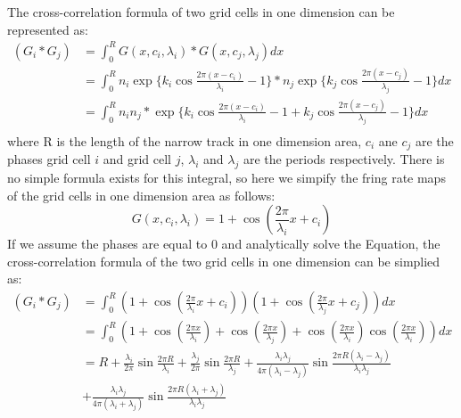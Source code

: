 \documentclass[11pt, letterpaper, onecolumn]{article}
\begin{document}
The cross-correlation formula of two grid cells in one dimension can be represented as:
\begin{equation}
\begin{split}
    (G_i * G_j)
    & = \int_{0}^{R} G(x,c_i,\lambda_i) * G(x,c_j,\lambda_j) dx \\
   & = \int_{0}^{R} n_i  \exp\{k_i \cos \frac{2 \pi (x - c_i)}{\lambda_i}-1 \} * n_j  \exp\{k_j \cos \frac{2 \pi (x - c_j)}{\lambda_j}-1 \} dx \\
   & = \int_{0}^{R} n_i n_j* \exp\{k_i \cos \frac{2 \pi (x - c_i)}{\lambda_i}-1 + k_j \cos \frac{2 \pi (x - c_j)}{\lambda_j}-1 \} dx  \\
\end{split}
\end{equation}
where R is the length of the narrow track in one dimension area, $c_i$ ane $c_j$ are the phases grid cell $i$ and grid cell $j$, $\lambda_i$ and $\lambda_j$ are the periods respectively. There is no simple formula exists for this integral, so here we simpify the fring rate maps of the grid cells in one dimension area as follows: 
\begin{equation}
    G(x, c_i,\lambda_i) = 1 + \cos(\frac{2 \pi}{\lambda_i} x + c_i)
\end{equation}
If we assume the phases are equal to 0 and analytically solve the Equation, the cross-correlation formula of the two grid cells in one dimension can be simplied as:
\begin{equation}
\label{eq:intresult}
\begin{split}
    (G_i * G_j)
    & = \int_{0}^{R} (1 + \cos(\frac{2 \pi}{\lambda_i} x + c_i)) (1 + \cos(\frac{2 \pi}{\lambda_j} x + c_j)) dx \\
    & = \int_{0}^{R} (1 + \cos(\frac{2 \pi x}{\lambda_i}) + \cos(\frac{2 \pi x}{\lambda_j}) + \cos(\frac{2 \pi x}{\lambda_i}) \cos(\frac{2 \pi x}{\lambda_i} )) dx \\
   & = R + \frac{\lambda_i}{2 \pi} \sin \frac{2 \pi R}{\lambda_i} + \frac{\lambda_j}{2 \pi} \sin \frac{2 \pi R}{\lambda_j} + \frac{\lambda_i \lambda_j}{4 \pi (\lambda_i - \lambda_j)} \sin \frac{2 \pi R (\lambda_i - \lambda_j)}{\lambda_i \lambda_j} \\
   & + \frac{\lambda_i \lambda_j}{4 \pi (\lambda_i + \lambda_j)} \sin \frac{2 \pi R (\lambda_i + \lambda_j)}{\lambda_i \lambda_j} \\
\end{split}
\end{equation}
\end{document}

